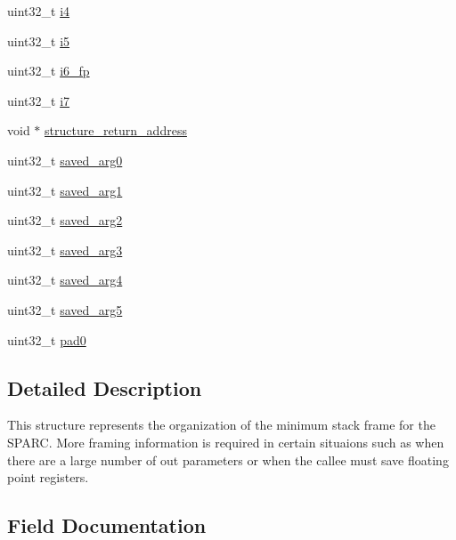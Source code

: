 \begin{DoxyCompactItemize}
\item 
uint32\+\_\+t \mbox{\hyperlink{structSPARC__Minimum__stack__frame_aba7e35104f1aafe001a5357462503843}{i4}}
\item 
uint32\+\_\+t \mbox{\hyperlink{structSPARC__Minimum__stack__frame_af3ab12df0f7fc02c564e9e38f9b0e404}{i5}}
\item 
uint32\+\_\+t \mbox{\hyperlink{structSPARC__Minimum__stack__frame_a88430dcddd786a170f62684793864ecf}{i6\+\_\+fp}}
\item 
uint32\+\_\+t \mbox{\hyperlink{structSPARC__Minimum__stack__frame_a4518fde3b06e61337f19d892986b3c6a}{i7}}
\item 
void $\ast$ \mbox{\hyperlink{structSPARC__Minimum__stack__frame_a9a5f2e132fd1d81c1b24c4da6f8ea9fa}{structure\+\_\+return\+\_\+address}}
\item 
uint32\+\_\+t \mbox{\hyperlink{structSPARC__Minimum__stack__frame_aba7dbe474302f9557db76b519e8f6c98}{saved\+\_\+arg0}}
\item 
uint32\+\_\+t \mbox{\hyperlink{structSPARC__Minimum__stack__frame_a3ad56e422513535e497aa195bb21c589}{saved\+\_\+arg1}}
\item 
uint32\+\_\+t \mbox{\hyperlink{structSPARC__Minimum__stack__frame_a6fdbafbc5b7afcd346121e4894262785}{saved\+\_\+arg2}}
\item 
uint32\+\_\+t \mbox{\hyperlink{structSPARC__Minimum__stack__frame_ad2485ef420e2ba5c8125ef3f71b8e521}{saved\+\_\+arg3}}
\item 
uint32\+\_\+t \mbox{\hyperlink{structSPARC__Minimum__stack__frame_a2d5001b7321753879b8124899b885d39}{saved\+\_\+arg4}}
\item 
uint32\+\_\+t \mbox{\hyperlink{structSPARC__Minimum__stack__frame_a142e99defd2bd6cd3b7049afdaa2c1ad}{saved\+\_\+arg5}}
\item 
uint32\+\_\+t \mbox{\hyperlink{structSPARC__Minimum__stack__frame_a412a9ccd3e6631f6671e0c567b47cd4b}{pad0}}
\end{DoxyCompactItemize}


\subsection{Detailed Description}
This structure represents the organization of the minimum stack frame for the S\+P\+A\+RC. More framing information is required in certain situaions such as when there are a large number of out parameters or when the callee must save floating point registers. 

\subsection{Field Documentation}
\mbox{\label{structSPARC__Minimum__stack__frame_a60aa3fb27daf17cce5f9bdbbd2c8b80e}} 
